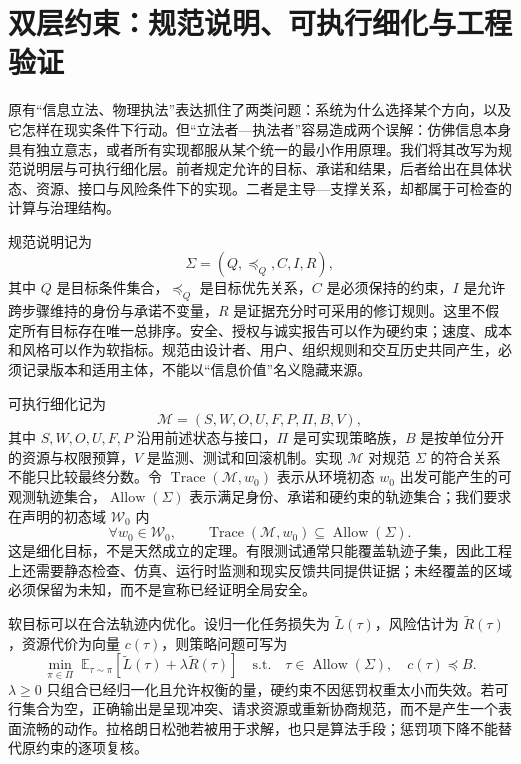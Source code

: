 \section{双层约束：规范说明、可执行细化与工程验证}
\label{sec:section_603}

原有“信息立法、物理执法”表达抓住了两类问题：系统为什么选择某个方向，以及它怎样在现实条件下行动。但“立法者—执法者”容易造成两个误解：仿佛信息本身具有独立意志，或者所有实现都服从某个统一的最小作用原理。我们将其改写为规范说明层与可执行细化层。前者规定允许的目标、承诺和结果，后者给出在具体状态、资源、接口与风险条件下的实现。二者是主导—支撑关系，却都属于可检查的计算与治理结构。

规范说明记为
\begin{equation}
  \Sigma=(Q,\preceq_Q,C,I,R),
\end{equation}
其中 $Q$ 是目标条件集合，$\preceq_Q$ 是目标优先关系，$C$ 是必须保持的约束，$I$ 是允许跨步骤维持的身份与承诺不变量，$R$ 是证据充分时可采用的修订规则。这里不假定所有目标存在唯一总排序。安全、授权与诚实报告可以作为硬约束；速度、成本和风格可以作为软指标。规范由设计者、用户、组织规则和交互历史共同产生，必须记录版本和适用主体，不能以“信息价值”名义隐藏来源。

可执行细化记为
\begin{equation}
  \mathcal M=(S,W,O,U,F,P,\Pi,B,V),
\end{equation}
其中 $S,W,O,U,F,P$ 沿用前述状态与接口，$\Pi$ 是可实现策略族，$B$ 是按单位分开的资源与权限预算，$V$ 是监测、测试和回滚机制。实现 $\mathcal M$ 对规范 $\Sigma$ 的符合关系不能只比较最终分数。令 $\operatorname{Trace}(\mathcal M,w_0)$ 表示从环境初态 $w_0$ 出发可能产生的可观测轨迹集合，$\operatorname{Allow}(\Sigma)$ 表示满足身份、承诺和硬约束的轨迹集合；我们要求在声明的初态域 $\mathcal W_0$ 内
\begin{equation}
  \forall w_0\in\mathcal W_0,\qquad
  \operatorname{Trace}(\mathcal M,w_0)
  \subseteq \operatorname{Allow}(\Sigma).
\end{equation}
这是细化目标，不是天然成立的定理。有限测试通常只能覆盖轨迹子集，因此工程上还需要静态检查、仿真、运行时监测和现实反馈共同提供证据；未经覆盖的区域必须保留为未知，而不是宣称已经证明全局安全。

软目标可以在合法轨迹内优化。设归一化任务损失为 $\widetilde L(\tau)$，风险估计为 $\widetilde R(\tau)$，资源代价为向量 $c(\tau)$，则策略问题可写为
\begin{equation}
  \min_{\pi\in\Pi}\;
  \mathbb E_{\tau\sim\pi}
  [\widetilde L(\tau)+\lambda\widetilde R(\tau)]
  \quad\text{s.t.}\quad
  \tau\in\operatorname{Allow}(\Sigma),\quad
  c(\tau)\preceq B.
\end{equation}
$\lambda\ge0$ 只组合已经归一化且允许权衡的量，硬约束不因惩罚权重太小而失效。若可行集合为空，正确输出是呈现冲突、请求资源或重新协商规范，而不是产生一个表面流畅的动作。拉格朗日松弛若被用于求解，也只是算法手段；惩罚项下降不能替代原约束的逐项复核。


